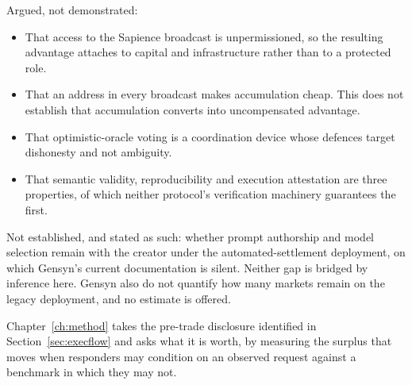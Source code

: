 Argued, not demonstrated:

\begin{itemize}
  \item That access to the Sapience broadcast is unpermissioned, so the resulting advantage
    attaches to capital and infrastructure rather than to a protected role.
  \item That an address in every broadcast makes accumulation cheap. This does not
    establish that accumulation converts into uncompensated advantage.
  \item That optimistic-oracle voting is a coordination device whose defences target
    dishonesty and not ambiguity.
  \item That semantic validity, reproducibility and execution attestation are three
    properties, of which neither protocol's verification machinery guarantees the first.
\end{itemize}

Not established, and stated as such: whether prompt authorship and model selection remain
with the creator under the automated-settlement deployment, on which Gensyn's current
documentation is silent. Neither gap is bridged by inference here. Gensyn also do not
quantify how many markets remain on the legacy deployment, and no estimate is offered.

Chapter~\ref{ch:method} takes the pre-trade disclosure identified in
Section~\ref{sec:execflow} and asks what it is worth, by measuring the surplus that moves
when responders may condition on an observed request against a benchmark in which they may
not.
